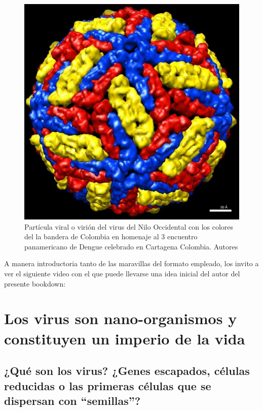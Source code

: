 \documentclass[
  spanish,
]{book}
\begin{document}
\begin{figure}
\centering
\includegraphics{./165496377_134509338676384_4186488905084681632_n.jpg}
\caption{Partícula viral o virión del virus del Nilo Occidental con los colores del la bandera de Colombia en homenaje al 3 encuentro panamericano de Dengue celebrado en Cartagena Colombia. Autores \citet{mukhopadhyay2003structure}}
\end{figure}

A manera introductoria tanto de las maravillas del formato empleado, los invito a ver el siguiente video con el que puede llevarse una idea inicial del autor del presente bookdown:

\hypertarget{los-virus-son-nano-organismos-y-constituyen-un-imperio-de-la-vida}{%
\chapter{Los virus son nano-organismos y constituyen un imperio de la vida}\label{los-virus-son-nano-organismos-y-constituyen-un-imperio-de-la-vida}}

\hypertarget{quuxe9-son-los-virus-genes-escapados-cuxe9lulas-reducidas-o-las-primeras-cuxe9lulas-que-se-dispersan-con-semillas}{%
\section{¿Qué son los virus? ¿Genes escapados, células reducidas o las primeras células que se dispersan con ``semillas''?}\label{quuxe9-son-los-virus-genes-escapados-cuxe9lulas-reducidas-o-las-primeras-cuxe9lulas-que-se-dispersan-con-semillas}}
\end{document}
